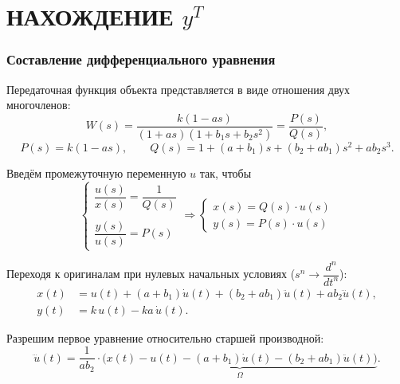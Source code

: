 \part{НАХОЖДЕНИЕ $y^T$}
    \section{Составление дифференциального уравнения}
        Передаточная функция объекта представляется в виде отношения двух многочленов:
        $$
            W(s) = \frac{k(1-as)}{(1+as)(1+b_1s+b_2s^2)} = \frac{P(s)}{Q(s)},
        $$
        $$
            P(s) = k(1-as), \qquad
            Q(s) = 1 + (a+b_1)s + (b_2+ab_1)s^2 + ab_2s^3.
        $$

        Введём промежуточную переменную $u$ так, чтобы
        $$
            \begin{cases}
                \dfrac{u(s)}{x(s)} = \dfrac{1}{Q(s)}
                \\\\
                \dfrac{y(s)}{u(s)} = P(s)
            \end{cases}
            \Rightarrow
            \begin{cases}
                x(s) = Q(s) \cdot u(s)
                \\
                y(s) = P(s) \cdot u(s)
            \end{cases}
        $$

        Переходя к оригиналам при нулевых начальных условиях ($s^n \to \dfrac{d^n}{dt^n}$):
        $$
            \begin{aligned}
                x(t) &= u(t) + (a+b_1)\dot{u}(t) + (b_2+ab_1)\ddot{u}(t) + ab_2\dddot{u}(t),
                \\
                y(t) &= k\,u(t) - ka\,\dot{u}(t).
            \end{aligned}
        $$

        Разрешим первое уравнение относительно старшей производной:
        $$
            \dddot{u}(t) = \frac{1}{ab_2} \cdot \underbrace{\Big(x(t) - u(t) - (a+b_1)\dot{u}(t) - (b_2 + ab_1)\ddot{u}(t)\Big)}_{\Omega}.
        $$

